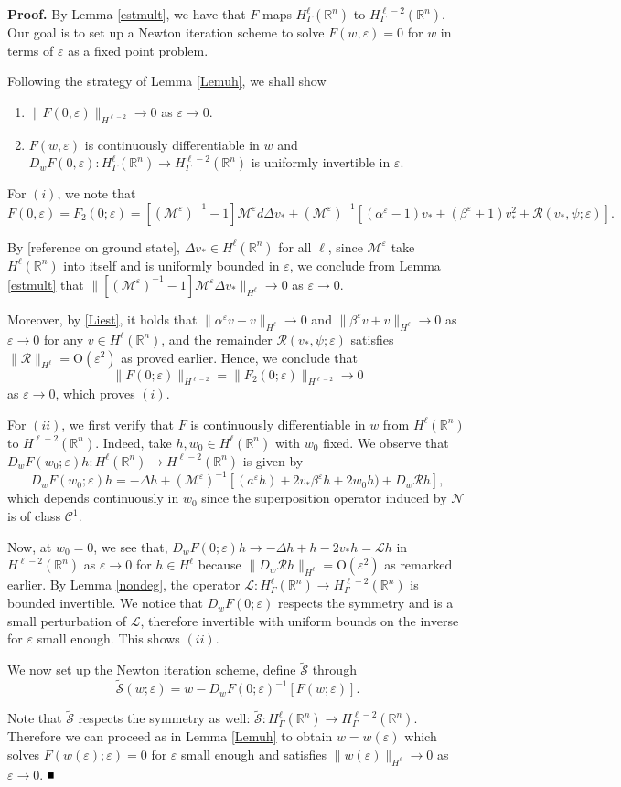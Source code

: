 \documentclass[10pt]{article}
\newenvironment{Proof}%
 {\begin{trivlist} \item[]{\bf Proof. }}%
 {\hspace*{\fill}$\rule{.4\baselineskip}{.4\baselineskip}$\end{trivlist}}
\newcommand{\R}{\mathbb{R}}
\newcommand{\rmO}{\mathrm{O}}
\newcommand{\eps}{\varepsilon}
\newcommand{\Nl}{\mathcal{N}}
\newcommand{\cS}{\mathcal{S}}
\newcommand{\cL}{\mathcal{L}}
\newcommand{\M}{\mathcal{M}}
\newcommand{\Rm}{\mathcal{R}}
\begin{document}
\begin{Proof}
By Lemma \ref{estmult}, we have that $F$ maps $H^\ell_{\Gamma}(\R^n)$ to $H_{\Gamma}^{\ell-2}(\R^n)$. Our goal is to set up a Newton iteration scheme to solve $ F(w,\eps) =0$ for $w$ in terms of $\eps$ as a fixed point problem.

Following the strategy of Lemma \ref{Lemuh}, we shall show
\begin{enumerate}
\item $\|F(0,\eps)\|_{H^{\ell-2}} \to 0$ as $\eps \to 0$.
\item $F(w,\eps)$ is continuously differentiable in $w$ and $D_wF(0,\eps): H^{\ell}_{\Gamma}(\R^n) \to H^{\ell-2}_{\Gamma}(\R^n)$ is uniformly invertible in $\eps$.
\end{enumerate}
For $(i)$, we note that
\[
F(0,\eps) = F_2(0;\eps) = [(\M^{\eps})^{-1}-1]\M^\eps d \Delta v_*+(\M^\eps)^{-1}[(\alpha^\eps-1)v_*+(\beta^\eps+1)v_*^2+\Rm(v_*,\psi;\eps)].
\]

By [reference on ground state], $\Delta v_* \in H^\ell(\R^n)$ for all $\ell$, since $\M^\eps$ take $H^\ell(\R^n)$ into itself and is uniformly bounded in $\eps$, we conclude from Lemma \ref{estmult} that 
$\|[(\M^{\eps})^{-1}-1]\M^\eps  \Delta v_* \|_{H^\ell} \to 0$
as $\eps \to 0$.

Moreover, by  \eqref{Liest}, it holds that $\| \alpha^\eps v -v\|_{H^\ell} \to 0$ and $\| \beta^\eps v + v\|_{H^\ell} \to 0$ as $\eps \to 0$ for any $v \in H^\ell(\R^n)$, and the remainder $\Rm(v_*,\psi;\eps)$ satisfies $\|\Rm\|_{H^\ell} = \rmO(\eps^2)$ as proved earlier. Hence, we conclude that 
\[
\| F(0;\eps)\|_{H^{\ell-2}} = \| F_2(0;\eps)\|_{H^{\ell-2} }\to 0
\]
as $\eps \to 0$, which proves $(i)$.

For $(ii)$, we first verify that $F$ is continuously differentiable in $w$ from $H^\ell (\R^n)$ to $H^{\ell-2}(\R^n)$. Indeed, take $h, w_0\in H^\ell(\R^n)$ with $w_0$ fixed. We observe that $D_wF(w_0;\eps)h:H^\ell (\R^n) \to H^{\ell-2}(\R^n)$ is given by
\[
D_wF(w_0;\eps)h = -\Delta h+(\M^\eps)^{-1}\left[(a^\eps h)+2v_*\beta^\eps h + 2w_0h)+D_w\Rm h\right],
\]
which depends continuously in $w_0$ since the superposition operator induced by $\Nl$ is of class $\mathscr{C}^1$.

Now, at $w_0 = 0$, we see that, $D_wF(0;\eps)h \to -\Delta h+h-2v_*h = \cL h$ in $H^{\ell-2}(\R^n)$ as $\eps \to 0$ for $h \in H^\ell$ because $\|D_w\Rm h\|_{H^\ell} = \rmO(\eps^2)$ as remarked earlier. By Lemma \ref{nondeg}, the operator $\cL : H^\ell_{\Gamma}(\R^n) \to H^{\ell-2}_{\Gamma}(\R^n)$ is bounded invertible. We notice that $D_wF(0;\eps)$ respects the symmetry and is a small perturbation of $\cL$, therefore invertible with uniform bounds on the inverse for $\eps$ small enough. This shows $(ii)$.

We now set up the Newton iteration scheme, define $\tilde{\cS}$ through
\[\tilde{\cS}(w;\eps) = w-D_wF(0;\eps)^{-1}[F(w;\eps)].\]

Note that $\tilde{\cS}$ respects the symmetry as well: $\tilde{\cS} : H^\ell_\Gamma(\R^n) \to H^{\ell-2}_\Gamma(\R^n)$. Therefore we can proceed as in Lemma \ref{Lemuh} to obtain $w=w(\eps)$ which solves $F(w(\eps);\eps) = 0$ for $\eps $ small enough and satisfies $\|w(\eps)\|_{H^\ell} \to 0$ as $\eps \to 0$.
\end{Proof}
\end{document}
